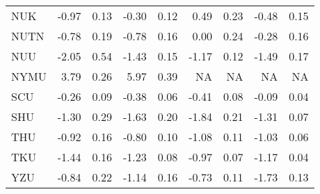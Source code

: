 \begin{longtable}[t]{lrrrrrrrr}
\hspace{1em}NUK & -0.97 & 0.13 & -0.30 & 0.12 & 0.49 & 0.23 & -0.48 & 0.15\\
\hspace{1em}NUTN & -0.78 & 0.19 & -0.78 & 0.16 & 0.00 & 0.24 & -0.28 & 0.16\\
\hspace{1em}NUU & -2.05 & 0.54 & -1.43 & 0.15 & -1.17 & 0.12 & -1.49 & 0.17\\
\hspace{1em}NYMU & 3.79 & 0.26 & 5.97 & 0.39 & NA & NA & NA & NA\\
\hspace{1em}SCU & -0.26 & 0.09 & -0.38 & 0.06 & -0.41 & 0.08 & -0.09 & 0.04\\
\hspace{1em}SHU & -1.30 & 0.29 & -1.63 & 0.20 & -1.84 & 0.21 & -1.31 & 0.07\\
\hspace{1em}THU & -0.92 & 0.16 & -0.80 & 0.10 & -1.08 & 0.11 & -1.03 & 0.06\\
\hspace{1em}TKU & -1.44 & 0.16 & -1.23 & 0.08 & -0.97 & 0.07 & -1.17 & 0.04\\
\hspace{1em}YZU & -0.84 & 0.22 & -1.14 & 0.16 & -0.73 & 0.11 & -1.73 & 0.13\\*
\end{longtable}

